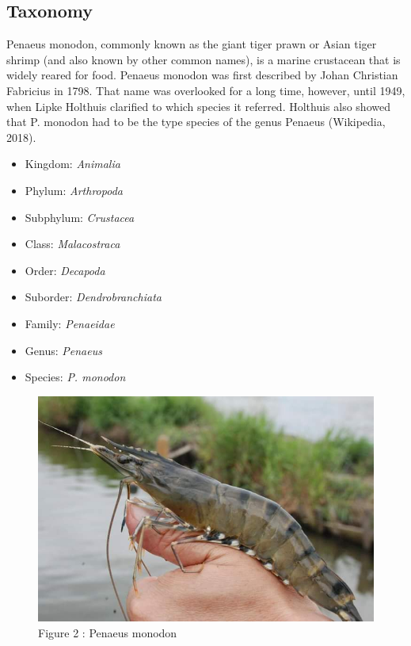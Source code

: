 \documentclass[
]{book}
\providecommand{\tightlist}{%
  \setlength{\itemsep}{0pt}\setlength{\parskip}{0pt}}
\begin{document}
\hypertarget{taxonomy}{%
\subsection{Taxonomy}\label{taxonomy}}

Penaeus monodon, commonly known as the giant tiger prawn or Asian tiger
shrimp (and also known by other common names), is a marine crustacean
that is widely reared for food. Penaeus monodon was first described by
Johan Christian Fabricius in 1798. That name was overlooked for a long
time, however, until 1949, when Lipke Holthuis clarified to which
species it referred. Holthuis also showed that P. monodon had to be the
type species of the genus Penaeus (Wikipedia, 2018).

\begin{itemize}
\tightlist
\item
  Kingdom: \emph{Animalia}
\item
  Phylum: \emph{Arthropoda}
\item
  Subphylum: \emph{Crustacea}
\item
  Class: \emph{Malacostraca}
\item
  Order: \emph{Decapoda}
\item
  Suborder: \emph{Dendrobranchiata}
\item
  Family: \emph{Penaeidae}
\item
  Genus: \emph{Penaeus}
\item
  Species: \emph{P. monodon}
\end{itemize}

\begin{figure}
\centering
\includegraphics{graphics/Figure-2.jpg}
\caption{Figure 2 : Penaeus monodon}
\end{figure}
\end{document}
